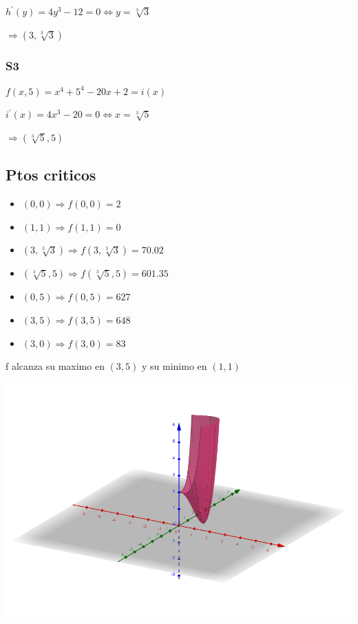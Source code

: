 \documentclass[../practica_06.tex]{subfiles}
\begin{document}
\begin{enumerate}
            $h^{\prime}(y) = 4y^3 - 12 = 0 \Leftrightarrow y = \sqrt[3]{3}$

            $\Rightarrow (3,\sqrt[3]{3})$

            \subsubsection{S3}

            $f(x,5) = x^4 + 5^4 - 20x +2 = i(x) $

            $i^{\prime}(x) = 4x^3 - 20 = 0 \Leftrightarrow x = \sqrt[3]{5}$

            $\Rightarrow (\sqrt[3]{5},5)$

            \subsection*{Ptos criticos}

            \begin{itemize}
                \item $(0,0) \Rightarrow f(0,0) = 2$
                \item $(1,1) \Rightarrow f(1,1) = 0$
                \item $(3,\sqrt[3]{3}) \Rightarrow f(3,\sqrt[3]{3}) = 70.02$
                \item $(\sqrt[3]{5},5) \Rightarrow f(\sqrt[3]{5},5) = 601.35$
                \item $(0,5) \Rightarrow f(0,5) = 627$
                \item $(3,5) \Rightarrow f(3,5) = 648$
                \item $(3,0) \Rightarrow f(3,0) = 83$
            \end{itemize}

            f alcanza su maximo en $(3,5)$ y su minimo en $(1,1)$

            \includegraphics[scale=0.4]{ej05/resources/5c.png}


\end{enumerate}
\end{document}
